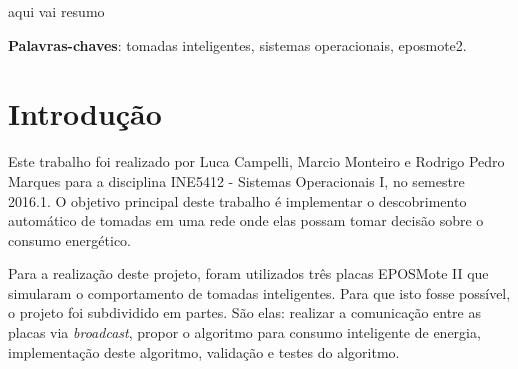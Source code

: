 \documentclass[article,11pt,oneside,a4paper,english,brazil]{abntex2}
\begin{document}
\frenchspacing 


%
%
\maketitle

\begin{resumoumacoluna}
	aqui vai resumo
	
	\vspace{\onelineskip}
	
	\noindent
	\textbf{Palavras-chaves}: tomadas inteligentes, sistemas operacionais, eposmote2.
\end{resumoumacoluna}


\textual

\section{Introdução}

	Este trabalho foi realizado por Luca Campelli, Marcio Monteiro e Rodrigo Pedro Marques para a disciplina INE5412 - Sistemas Operacionais I, no semestre 2016.1. O objetivo principal deste trabalho é implementar o descobrimento automático de tomadas em uma rede onde elas possam tomar decisão sobre o consumo energético.
	
	Para a realização deste projeto, foram utilizados três placas EPOSMote II \cite{eposproject} que simularam o comportamento de tomadas inteligentes. Para que isto fosse possível, o projeto foi subdividido em partes. São elas: realizar a comunicação entre as placas via \textit{broadcast}, propor o algoritmo para consumo inteligente de energia, implementação deste algoritmo, validação e testes do algoritmo.
	
\end{document}
